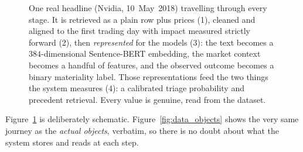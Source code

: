 \begin{figure}[ht]
\caption[One real headline through the whole system]{One real headline (Nvidia, 10~May~2018)
travelling through every stage. It is retrieved as a plain row plus prices (1), cleaned and aligned to
the first trading day with impact measured strictly forward (2), then \emph{represented} for the models
(3): the text becomes a $384$-dimensional Sentence-BERT embedding, the market context becomes a handful
of features, and the observed outcome becomes a binary materiality label. Those representations feed the
two things the system measures (4): a calibrated triage probability and precedent retrieval. Every value
is genuine, read from the dataset.}
\label{fig:data_journey}
\end{figure}

Figure~\ref{fig:data_journey} is deliberately schematic. Figure~\ref{fig:data_objects} shows the
very same journey as the \emph{actual objects}, verbatim, so there is no doubt about what the
system stores and reads at each step.

